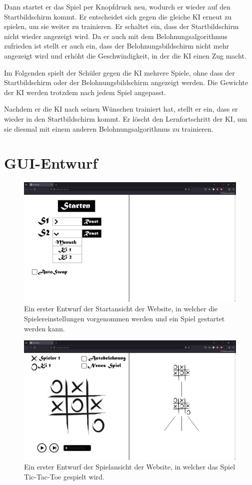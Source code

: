 \documentclass[titlepage]{scrartcl}
\begin{document}
Dann startet er das Spiel per Knopfdruck neu, wodurch er wieder auf den Startbildschirm kommt.
Er entscheidet sich gegen die gleiche KI erneut zu spielen, um sie weiter zu trainieren.
Er schaltet ein, dass der Startbildschirm nicht wieder angezeigt wird.
Da er auch mit dem Belohnungsalgorithmus zufrieden ist stellt er auch ein, dass der Belohnungsbildschirm nicht mehr angezeigt wird und erhöht die Geschwindigkeit, in der die KI einen Zug macht.

Im Folgenden spielt der Schüler gegen die KI mehrere Spiele, ohne dass der Startbildschirm oder der Belohnungsbildschirm angezeigt werden.
Die Gewichte der KI werden trotzdem nach jedem Spiel angepasst.

Nachdem er die KI nach seinen Wünschen trainiert hat, stellt er ein, dass er wieder in den Startbildschirm kommt.
Er löscht den Lernfortschritt der KI, um sie diesmal mit einem anderen Belohnungsalgorithmus zu trainieren.

\section{GUI-Entwurf}
\begin{figure}[ht]
\includegraphics[width=\textwidth]{tictactoe_startansicht.png}
\caption{Ein erster Entwurf der Startansicht der Website, in welcher die Spielereinstellungen vorgenommen werden und ein Spiel gestartet werden kann.}
\end{figure}

\begin{figure}[ht]
\includegraphics[width=\textwidth]{tictactoe_spielansicht.png}
\caption{Ein erster Entwurf der Spielansicht der Website, in welcher das Spiel Tic-Tac-Toe gespielt wird.}
\end{figure}
\end{document}
